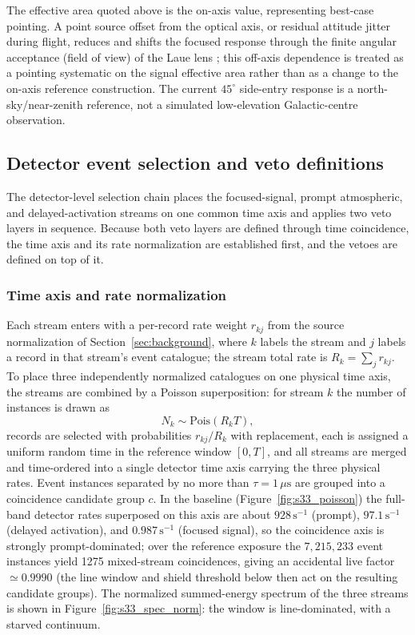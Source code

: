 \documentclass[11pt]{article}
\begin{document}
The effective area quoted above is the on-axis value, representing best-case
pointing. A point source offset from the optical axis, or residual attitude
jitter during flight, reduces and shifts the focused response through the finite
angular acceptance (field of view) of the Laue lens
\cite{Barriere2009Laue,Weidenspointner2006MAX}; this off-axis dependence is
treated as a pointing systematic on the signal effective area rather than as a
change to the on-axis reference construction. The current $45^\circ$
side-entry response is a north-sky/near-zenith reference, not a simulated
low-elevation Galactic-centre observation.

\subsection{Detector event selection and veto definitions}
\label{sec:selection}

The detector-level selection chain places the focused-signal, prompt
atmospheric, and delayed-activation streams on one common time axis and applies
two veto layers in sequence. Because both veto layers are defined through time
coincidence, the time axis and its rate normalization are established first, and
the vetoes are defined on top of it.

\subsubsection{Time axis and rate normalization}

Each stream enters with a per-record rate weight $r_{kj}$ from the source
normalization of Section~\ref{sec:background}, where $k$ labels the stream and
$j$ labels a record in that stream's event catalogue; the stream total rate is
$R_k=\sum_j r_{kj}$. To place three independently normalized catalogues on one
physical time axis, the streams are combined by a Poisson superposition: for
stream $k$ the number of instances is drawn as
\begin{equation}
  N_k\sim \mathrm{Pois}(R_k T),
\end{equation}
records are selected with probabilities $r_{kj}/R_k$ with replacement, each is
assigned a uniform random time in the reference window $[0,T]$, and all streams
are merged and time-ordered into a single detector time axis carrying the three
physical rates. Event instances separated by no more than $\tau=1\,\mu\mathrm{s}$
are grouped into a coincidence candidate group $c$. In the baseline (Figure~\ref{fig:s33_poisson}) the full-band detector rates superposed on this axis are about $928\,\mathrm{s^{-1}}$ (prompt), $97.1\,\mathrm{s^{-1}}$ (delayed activation), and $0.987\,\mathrm{s^{-1}}$ (focused signal), so the coincidence axis is strongly prompt-dominated; over the reference exposure the $7{,}215{,}233$ event instances yield 1275 mixed-stream coincidences, giving an accidental live factor $\simeq0.9990$ (the line window and shield threshold below then act on the resulting candidate groups). The normalized summed-energy spectrum of the three streams is shown in Figure~\ref{fig:s33_spec_norm}: the window is line-dominated, with a starved continuum.
\end{document}
